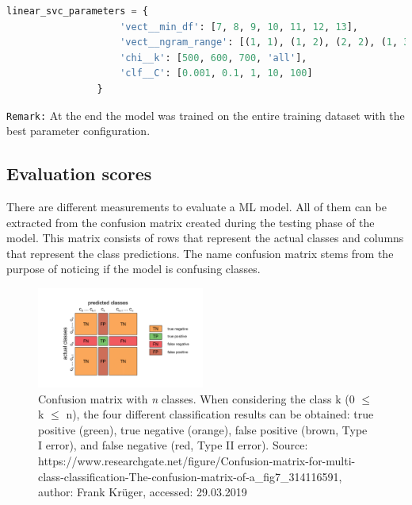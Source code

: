 \begin{lstlisting}[language=Python, caption=Tuned hyperparameters of the linearSVC fitting algorithm, label=codelinearsvcparameters]
linear_svc_parameters = {
                    'vect__min_df': [7, 8, 9, 10, 11, 12, 13],
                    'vect__ngram_range': [(1, 1), (1, 2), (2, 2), (1, 3)],
                    'chi__k': [500, 600, 700, 'all'],
                    'clf__C': [0.001, 0.1, 1, 10, 100]
                }
\end{lstlisting}

\texttt{Remark:} At the end the model was trained on the entire training dataset with the best parameter configuration.\\

\subsection{Evaluation scores} \label{ml_evaluation_scores}
There are different measurements to evaluate a ML model. All of them can be extracted from the confusion matrix created during the testing phase of the model. This matrix consists of rows that represent the actual classes and columns that represent the class predictions. The name confusion matrix stems from the purpose of noticing if the model is confusing classes.

\begin{figure} %
    \centerline{\includegraphics[trim={0 0 0 0},clip,width=0.49\textwidth]{img/Confusion_matrix_edited}}
  \caption{Confusion matrix with \textit{n} classes. When considering the class k (0 $\le$ k $\le$ n), the four different classification results can be obtained: true positive (green), true negative (orange), false positive (brown, Type I error), and false negative (red, Type II error). Source: https://www.researchgate.net/figure/Confusion-matrix-for-multi-class-classification-The-confusion-matrix-of-a\_fig7\_314116591, author: Frank Kr\"uger, accessed: 29.03.2019}
  \label{fig:confusion_matrix_illustration}
\end{figure}

